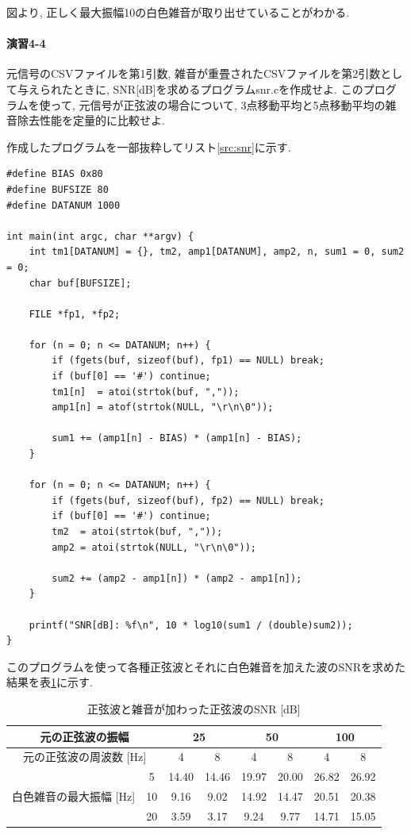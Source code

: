 \documentclass[titlepage]{jsarticle}
\begin{document}
        図より, 正しく最大振幅10の白色雑音が取り出せていることがわかる.

    \paragraph{演習4-4} 元信号のCSVファイルを第1引数, 雑音が重畳されたCSVファイルを第2引数として与えられたときに,
    SNR[dB]を求めるプログラムsnr.cを作成せよ. このプログラムを使って,
    元信号が正弦波の場合について, 3点移動平均と5点移動平均の雑音除去性能を定量的に比較せよ.
        
        作成したプログラムを一部抜粋してリスト\ref{src:snr}に示す.

        \begin{lstlisting}[caption=snr.c, label=src:snr]
#define BIAS 0x80
#define BUFSIZE 80
#define DATANUM 1000

int main(int argc, char **argv) {
    int tm1[DATANUM] = {}, tm2, amp1[DATANUM], amp2, n, sum1 = 0, sum2 = 0;
    char buf[BUFSIZE];

    FILE *fp1, *fp2;

    for (n = 0; n <= DATANUM; n++) {
        if (fgets(buf, sizeof(buf), fp1) == NULL) break;
        if (buf[0] == '#') continue;
        tm1[n]  = atoi(strtok(buf, ","));
        amp1[n] = atof(strtok(NULL, "\r\n\0"));

        sum1 += (amp1[n] - BIAS) * (amp1[n] - BIAS);
    }

    for (n = 0; n <= DATANUM; n++) {
        if (fgets(buf, sizeof(buf), fp2) == NULL) break;
        if (buf[0] == '#') continue;
        tm2  = atoi(strtok(buf, ","));
        amp2 = atoi(strtok(NULL, "\r\n\0"));

        sum2 += (amp2 - amp1[n]) * (amp2 - amp1[n]);
    }

    printf("SNR[dB]: %f\n", 10 * log10(sum1 / (double)sum2));
}\end{lstlisting}

        このプログラムを使って各種正弦波とそれに白色雑音を加えた波のSNRを求めた結果を表\ref{tab:snr1}に示す.

        \begin{table}[h]
            \centering
            \caption{正弦波と雑音が加わった正弦波のSNR [dB]}
            \label{tab:snr1}
            \begin{tabular}{c|c||cc|cc|cc} \hline
                \multicolumn{2}{c||}{元の正弦波の振幅} & \multicolumn{2}{c|}{25} & \multicolumn{2}{c|}{50} & \multicolumn{2}{c}{100} \\ \hline
                \multicolumn{2}{c||}{元の正弦波の周波数 [Hz]} & 4 & 8 & 4 & 8 & 4 & 8 \\ \hline \hline
                & 5 & 14.40 & 14.46 & 19.97 & 20.00 & 26.82 & 26.92 \\
                白色雑音の最大振幅 [Hz] & 10 & 9.16 & 9.02 & 14.92 & 14.47 & 20.51 & 20.38 \\
                & 20 & 3.59 & 3.17 & 9.24 & 9.77 & 14.71 & 15.05 \\ \hline
            \end{tabular}
        \end{table}
\end{document}
